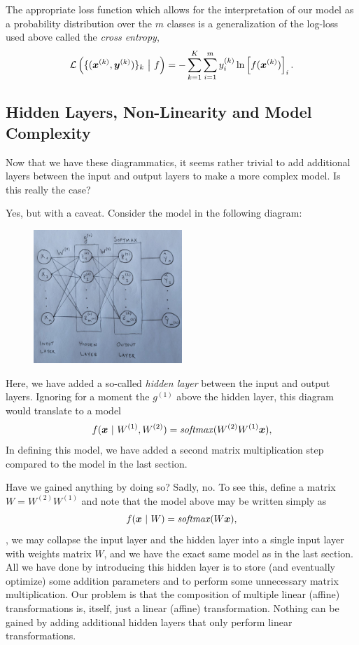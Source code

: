 The appropriate loss function which allows for the interpretation of our model as a probability distribution over the $m$ classes is a generalization of the log-loss used above called the \textit{cross entropy},
%
\begin{equation}
    \mathcal{L}\left(\{(\bm{x}^{(k)}, \bm{y}^{(k)})\}_k ~\big|~ f\right) = -\sum_{k=1}^K \sum_{i=1}^m y^{(k)}_i \ln \left[f(\bm{x}^{(k)})\right]_i.
\end{equation}
%

%
%
\subsection{Hidden Layers, Non-Linearity and Model Complexity}
%
%
Now that we have these diagrammatics, it seems rather trivial to add additional layers between the input and output layers to make a more complex model.
Is this really the case?

Yes, but with a caveat. Consider the model in the following diagram:
%
\begin{figure}[H]
    \centering
    \includegraphics[width=0.5\textwidth]{../figures/chapter_01/nn_diagram_hidden_layers.png}
\end{figure}
%
\noindent Here, we have added a so-called \textit{hidden layer} between the input and output layers.
Ignoring for a moment the $g^{(1)}$ above the hidden layer, this diagram would translate to a model
%
\begin{equation}
    f(\bm{x} ~|~ W^{(1)}, W^{(2)}) = \operatorname*{\text{\textit{softmax}}}(W^{(2)} W^{(1)} \bm{x}),
\end{equation}
%
In defining this model, we have added a second matrix multiplication step compared to the model in the last section.

Have we gained anything by doing so?
Sadly, no.
To see this, define a matrix $W = W^{(2)} W^{(1)}$ and note that the model above may be written simply as
%
\begin{equation}
    f(\bm{x} ~|~ W) = \operatorname*{\text{\textit{softmax}}}(W \bm{x}),
\end{equation}
%
\ie, we may collapse the input layer and the hidden layer into a single input layer with weights matrix $W$, and we have the exact same model as in the last section.
All we have done by introducing this hidden layer is to store (and eventually optimize) some addition parameters and to perform some unnecessary matrix multiplication.
Our problem is that the composition of multiple linear (affine) transformations is, itself, just a linear (affine) transformation.
Nothing can be gained by adding additional hidden layers that only perform linear transformations.

